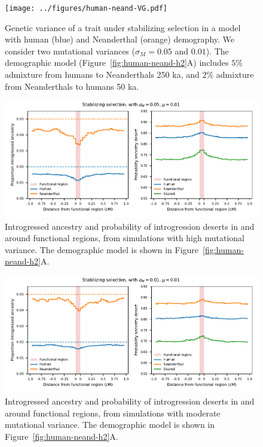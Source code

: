 \documentclass[]{article}
\begin{document}
\begin{figure}[t!]
    \centering
    \texttt{[image: ../figures/human-neand-VG.pdf]}
    \caption{
        Genetic variance of a trait under stabilizing selection in a model with
        human (blue) and Neanderthal (orange) demography. We consider two
        mutational variances ($\sigma_M=0.05$ and $0.01$). The demographic model
        (Figure~\ref{fig:human-neand-h2}A) includes $5\%$ admixture from humans
        to Neanderthals 250 ka, and $2\%$ admixture from Neanderthals to humans
        50 ka.
    }
    \label{fig:human-neand-VG}
\end{figure}


\begin{figure}[ht!]
    \centering
    \includegraphics{../figures/introgression_deserts.SD_0.05.pdf}
    \caption{
        Introgressed ancestry and probability of introgression deserts in and
        around functional regions, from simulations with high mutational variance.
        The demographic model is shown in Figure~\ref{fig:human-neand-h2}A.
    }
    \label{fig:deserts-high-VM}
\end{figure}

\begin{figure}[ht!]
    \centering
    \includegraphics{../figures/introgression_deserts.SD_0.01.pdf}
    \caption{
        Introgressed ancestry and probability of introgression deserts in and
        around functional regions, from simulations with moderate mutational variance.
        The demographic model is shown in Figure~\ref{fig:human-neand-h2}A.
    }
    \label{fig:deserts-med-VM}
\end{figure}
\end{document}
